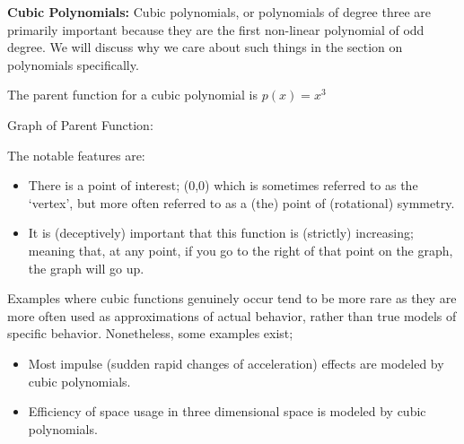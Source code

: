 \documentclass{ximeraXloud}
\begin{document}
        \textbf{Cubic Polynomials:} Cubic polynomials, or polynomials of degree three are primarily important because they are the first non-linear polynomial of odd degree. We will discuss why we care about such things in the section on polynomials specifically.
        
        \begin{description}
            \item[Parent Function:] The parent function for a cubic polynomial is $p(x) = x^3$\\
            \begin{minipage}{\textwidth}\item[Graph of Parent Function:]\hspace*{0pt} \\
                \begin{center}
                \end{center}
            \end{minipage}
            
            \item[Notable Features of Graph:] The notable features are:
            \begin{itemize}
                \item There is a point of interest; (0,0) which is sometimes referred to as the `vertex', but more often referred to as a (the) point of (rotational) symmetry.
                \item It is (deceptively) important that this function is (strictly) increasing; meaning that, at any point, if you go to the right of that point on the graph, the graph will go up.
            \end{itemize}
            \item[Example usage:] Examples where cubic functions genuinely occur tend to be more rare as they are more often used as approximations of actual behavior, rather than true models of specific behavior. Nonetheless, some examples exist;
            
            \begin{itemize}
                \item Most impulse (sudden rapid changes of acceleration) effects are modeled by cubic polynomials.
                \item Efficiency of space usage in three dimensional space is modeled by cubic polynomials.
            \end{itemize}
        \end{description}
        
\end{document}
